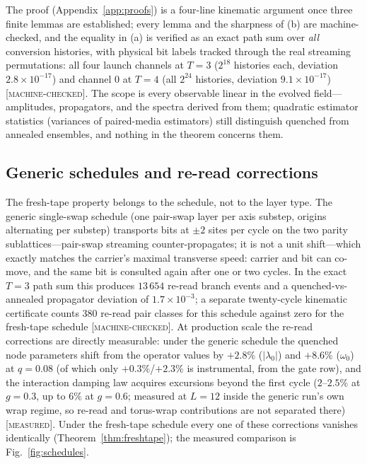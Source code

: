 \documentclass[aps,prd,twocolumn,superscriptaddress,nofootinbib,floatfix]{revtex4-2}
\newcommand{\evM}{\textnormal{\textsc{[machine-checked]}}}
\newcommand{\evX}{\textnormal{\textsc{[measured]}}}
\begin{document}
The proof (Appendix~\ref{app:proofs}) is a four-line kinematic argument
once three finite lemmas are established; every lemma and the sharpness
of (b) are machine-checked, and the equality in (a) is verified as an
exact path sum over \emph{all} conversion histories, with physical bit
labels tracked through the real streaming permutations: all four launch
channels at $T=3$ ($2^{18}$ histories each, deviation
$2.8\times10^{-17}$) and channel $0$ at $T=4$ (all $2^{24}$ histories,
deviation $9.1\times10^{-17}$) \evM{}. The scope is every observable
linear in the evolved field---amplitudes, propagators, and the spectra
derived from them; quadratic estimator statistics (variances of
paired-media estimators) still distinguish quenched from annealed
ensembles, and nothing in the theorem concerns them.

\subsection{Generic schedules and re-read corrections}
\label{sec:generic}

The fresh-tape property belongs to the schedule, not to the layer type.
The generic single-swap schedule (one pair-swap layer per axis substep,
origins alternating per substep) transports bits at $\pm2$ sites per
cycle on the two parity sublattices---pair-swap streaming
counter-propagates; it is not a unit shift---which exactly matches the
carrier's maximal transverse speed: carrier and bit can co-move, and the
same bit is consulted again after one or two cycles. In the exact
$T=3$ path sum this produces $13\,654$ re-read branch events and a
quenched-vs-annealed propagator deviation of $1.7\times10^{-3}$; a
separate twenty-cycle kinematic certificate counts $380$ re-read pair
classes for this schedule against zero for the fresh-tape schedule
\evM{}. At production scale
the re-read corrections are directly measurable: under the generic
schedule the quenched node parameters shift from the operator values by
$+2.8\%$ ($|\lambda_0|$) and $+8.6\%$ ($\omega_0$) at $q=0.08$ (of
which only $+0.3\%$/$+2.3\%$ is instrumental, from the gate row), and
the interaction damping law acquires excursions beyond the first cycle
($2$--$2.5\%$ at $g=0.3$, up to $6\%$ at $g=0.6$; measured at $L=12$
inside the generic run's own wrap regime, so re-read and torus-wrap
contributions are not separated there) \evX{}. Under the fresh-tape schedule every one of these
corrections vanishes identically (Theorem~\ref{thm:freshtape}); the
measured comparison is Fig.~\ref{fig:schedules}.
\end{document}
